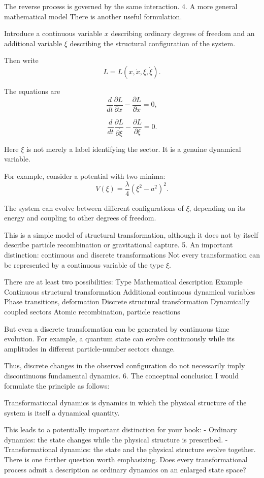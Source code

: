 The reverse process is governed by the same interaction.
4. A more general mathematical model
There is another useful formulation.

Introduce a continuous variable \(x\) describing ordinary degrees of freedom and an additional variable \(\xi\) describing the structural configuration of the system.

Then write
\[
L=L(x,\dot x,\xi,\dot\xi).
\]

The equations are
\[
\frac{d}{dt}\frac{\partial L}{\partial\dot x}
-\frac{\partial L}{\partial x}=0,
\]

\[
\frac{d}{dt}\frac{\partial L}{\partial\dot\xi}
-\frac{\partial L}{\partial\xi}=0.
\]

Here \(\xi\) is not merely a label identifying the sector. It is a genuine dynamical variable.

For example, consider a potential with two minima:
\[
V(\xi)=\frac{\lambda}{4}(\xi^2-a^2)^2.
\]

The system can evolve between different configurations of \(\xi\), depending on its energy and coupling to other degrees of freedom.

This is a simple model of structural transformation, although it does not by itself describe particle recombination or gravitational capture.
5. An important distinction: continuous and discrete transformations
Not every transformation can be represented by a continuous variable of the type \(\xi\).

There are at least two possibilities:
Type	Mathematical description	Example
Continuous structural transformation	Additional continuous dynamical variables	Phase transitions, deformation
Discrete structural transformation	Dynamically coupled sectors	Atomic recombination, particle reactions

But even a discrete transformation can be generated by continuous time evolution. For example, a quantum state can evolve continuously while its amplitudes in different particle-number sectors change.

Thus, discrete changes in the observed configuration do not necessarily imply discontinuous fundamental dynamics.
6. The conceptual conclusion
I would formulate the principle as follows:

Transformational dynamics is dynamics in which the physical structure of the system is itself a dynamical quantity.

This leads to a potentially important distinction for your book:
- Ordinary dynamics: the state changes while the physical structure is prescribed.
- Transformational dynamics: the state and the physical structure evolve together.
There is one further question worth emphasizing. Does every transformational process admit a description as ordinary dynamics on an enlarged state space?


